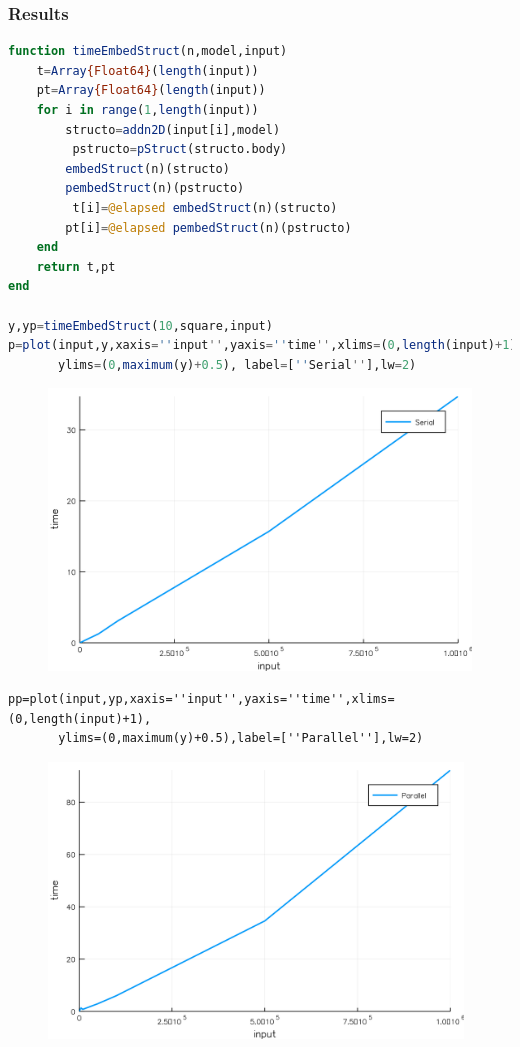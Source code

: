 \documentclass[a4paper,12pt]{article}
\begin{document}
\subsubsection{Results}
\begin{lstlisting}[language=Julia]
function timeEmbedStruct(n,model,input)
	t=Array{Float64}(length(input))
	pt=Array{Float64}(length(input))
	for i in range(1,length(input))
	    structo=addn2D(input[i],model)
	     pstructo=pStruct(structo.body)
	    embedStruct(n)(structo)
	    pembedStruct(n)(pstructo)
	     t[i]=@elapsed embedStruct(n)(structo)
	    pt[i]=@elapsed pembedStruct(n)(pstructo)
	end
	return t,pt
end

y,yp=timeEmbedStruct(10,square,input)
p=plot(input,y,xaxis=''input'',yaxis=''time'',xlims=(0,length(input)+1),
       ylims=(0,maximum(y)+0.5), label=[''Serial''],lw=2)
\end{lstlisting}
\begin{figure}[ht!]
\centering
\includegraphics[width=13cm,scale=0.3]{embedStruct.png}
\end{figure}
\newpage
\begin{verbatim}
pp=plot(input,yp,xaxis=''input'',yaxis=''time'',xlims=(0,length(input)+1),
       ylims=(0,maximum(y)+0.5),label=[''Parallel''],lw=2)
\end{verbatim}
\begin{figure}[ht!]
\centering
\includegraphics[width=11cm,scale=0.3]{pembedstruct.png}
\end{figure}
\end{document}
